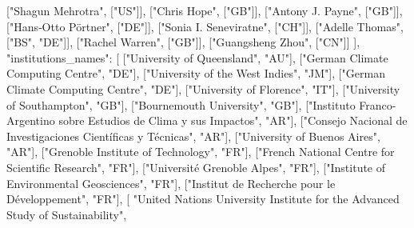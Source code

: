 \documentclass[
]{article}
\newenvironment{Shaded}{}{}
\newcommand{\DataTypeTok}[1]{\textcolor[rgb]{0.56,0.13,0.00}{#1}}
\newcommand{\FunctionTok}[1]{\textcolor[rgb]{0.02,0.16,0.49}{#1}}
\newcommand{\OtherTok}[1]{\textcolor[rgb]{0.00,0.44,0.13}{#1}}
\newcommand{\StringTok}[1]{\textcolor[rgb]{0.25,0.44,0.63}{#1}}
\begin{document}
\begin{Shaded}
\begin{Highlighting}[]
    \OtherTok{[}\StringTok{"Shagun Mehrotra"}\OtherTok{,} \OtherTok{[}\StringTok{"US"}\OtherTok{]],}
    \OtherTok{[}\StringTok{"Chris Hope"}\OtherTok{,} \OtherTok{[}\StringTok{"GB"}\OtherTok{]],}
    \OtherTok{[}\StringTok{"Antony J. Payne"}\OtherTok{,} \OtherTok{[}\StringTok{"GB"}\OtherTok{]],}
    \OtherTok{[}\StringTok{"Hans‐Otto Pörtner"}\OtherTok{,} \OtherTok{[}\StringTok{"DE"}\OtherTok{]],}
    \OtherTok{[}\StringTok{"Sonia I. Seneviratne"}\OtherTok{,} \OtherTok{[}\StringTok{"CH"}\OtherTok{]],}
    \OtherTok{[}\StringTok{"Adelle Thomas"}\OtherTok{,} \OtherTok{[}\StringTok{"BS"}\OtherTok{,} \StringTok{"DE"}\OtherTok{]],}
    \OtherTok{[}\StringTok{"Rachel Warren"}\OtherTok{,} \OtherTok{[}\StringTok{"GB"}\OtherTok{]],}
    \OtherTok{[}\StringTok{"Guangsheng Zhou"}\OtherTok{,} \OtherTok{[}\StringTok{"CN"}\OtherTok{]]}
  \OtherTok{]}\FunctionTok{,}
  \DataTypeTok{"institutions\_names"}\FunctionTok{:} \OtherTok{[}
    \OtherTok{[}\StringTok{"University of Queensland"}\OtherTok{,} \StringTok{"AU"}\OtherTok{],}
    \OtherTok{[}\StringTok{"German Climate Computing Centre"}\OtherTok{,} \StringTok{"DE"}\OtherTok{],}
    \OtherTok{[}\StringTok{"University of the West Indies"}\OtherTok{,} \StringTok{"JM"}\OtherTok{],}
    \OtherTok{[}\StringTok{"German Climate Computing Centre"}\OtherTok{,} \StringTok{"DE"}\OtherTok{],}
    \OtherTok{[}\StringTok{"University of Florence"}\OtherTok{,} \StringTok{"IT"}\OtherTok{],}
    \OtherTok{[}\StringTok{"University of Southampton"}\OtherTok{,} \StringTok{"GB"}\OtherTok{],}
    \OtherTok{[}\StringTok{"Bournemouth University"}\OtherTok{,} \StringTok{"GB"}\OtherTok{],}
    \OtherTok{[}\StringTok{"Instituto Franco{-}Argentino sobre Estudios de Clima y sus Impactos"}\OtherTok{,} \StringTok{"AR"}\OtherTok{],}
    \OtherTok{[}\StringTok{"Consejo Nacional de Investigaciones Científicas y Técnicas"}\OtherTok{,} \StringTok{"AR"}\OtherTok{],}
    \OtherTok{[}\StringTok{"University of Buenos Aires"}\OtherTok{,} \StringTok{"AR"}\OtherTok{],}
    \OtherTok{[}\StringTok{"Grenoble Institute of Technology"}\OtherTok{,} \StringTok{"FR"}\OtherTok{],}
    \OtherTok{[}\StringTok{"French National Centre for Scientific Research"}\OtherTok{,} \StringTok{"FR"}\OtherTok{],}
    \OtherTok{[}\StringTok{"Université Grenoble Alpes"}\OtherTok{,} \StringTok{"FR"}\OtherTok{],}
    \OtherTok{[}\StringTok{"Institute of Environmental Geosciences"}\OtherTok{,} \StringTok{"FR"}\OtherTok{],}
    \OtherTok{[}\StringTok{"Institut de Recherche pour le Développement"}\OtherTok{,} \StringTok{"FR"}\OtherTok{],}
    \OtherTok{[}
      \StringTok{"United Nations University Institute for the Advanced Study of Sustainability"}\OtherTok{,}

\end{Highlighting}
\end{Shaded}
\end{document}
